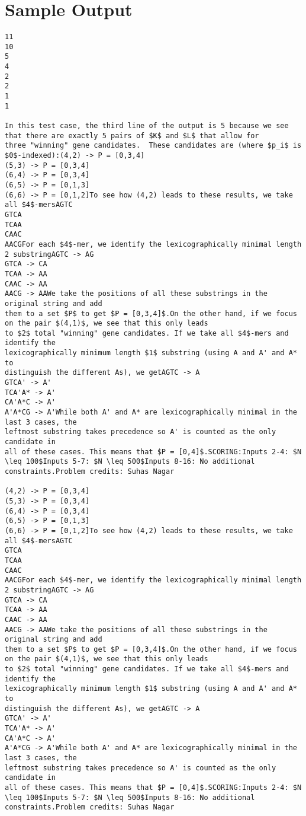 \documentclass[12pt]{article}
\begin{document}
\section*{Sample Output}
\begin{verbatim}
11
10
5
4
2
2
1
1

In this test case, the third line of the output is 5 because we see that there are exactly 5 pairs of $K$ and $L$ that allow for
three "winning" gene candidates.  These candidates are (where $p_i$ is $0$-indexed):(4,2) -> P = [0,3,4]
(5,3) -> P = [0,3,4]
(6,4) -> P = [0,3,4]
(6,5) -> P = [0,1,3]
(6,6) -> P = [0,1,2]To see how (4,2) leads to these results, we take all $4$-mersAGTC
GTCA
TCAA
CAAC
AACGFor each $4$-mer, we identify the lexicographically minimal length 2 substringAGTC -> AG
GTCA -> CA
TCAA -> AA
CAAC -> AA
AACG -> AAWe take the positions of all these substrings in the original string and add
them to a set $P$ to get $P = [0,3,4]$.On the other hand, if we focus on the pair $(4,1)$, we see that this only leads
to $2$ total "winning" gene candidates. If we take all $4$-mers and identify the
lexicographically minimum length $1$ substring (using A and A' and A* to
distinguish the different As), we getAGTC -> A
GTCA' -> A'
TCA'A* -> A'
CA'A*C -> A'
A'A*CG -> A'While both A' and A* are lexicographically minimal in the last 3 cases, the
leftmost substring takes precedence so A' is counted as the only candidate in
all of these cases. This means that $P = [0,4]$.SCORING:Inputs 2-4: $N \leq 100$Inputs 5-7: $N \leq 500$Inputs 8-16: No additional constraints.Problem credits: Suhas Nagar

(4,2) -> P = [0,3,4]
(5,3) -> P = [0,3,4]
(6,4) -> P = [0,3,4]
(6,5) -> P = [0,1,3]
(6,6) -> P = [0,1,2]To see how (4,2) leads to these results, we take all $4$-mersAGTC
GTCA
TCAA
CAAC
AACGFor each $4$-mer, we identify the lexicographically minimal length 2 substringAGTC -> AG
GTCA -> CA
TCAA -> AA
CAAC -> AA
AACG -> AAWe take the positions of all these substrings in the original string and add
them to a set $P$ to get $P = [0,3,4]$.On the other hand, if we focus on the pair $(4,1)$, we see that this only leads
to $2$ total "winning" gene candidates. If we take all $4$-mers and identify the
lexicographically minimum length $1$ substring (using A and A' and A* to
distinguish the different As), we getAGTC -> A
GTCA' -> A'
TCA'A* -> A'
CA'A*C -> A'
A'A*CG -> A'While both A' and A* are lexicographically minimal in the last 3 cases, the
leftmost substring takes precedence so A' is counted as the only candidate in
all of these cases. This means that $P = [0,4]$.SCORING:Inputs 2-4: $N \leq 100$Inputs 5-7: $N \leq 500$Inputs 8-16: No additional constraints.Problem credits: Suhas Nagar


\end{verbatim}
\end{document}
